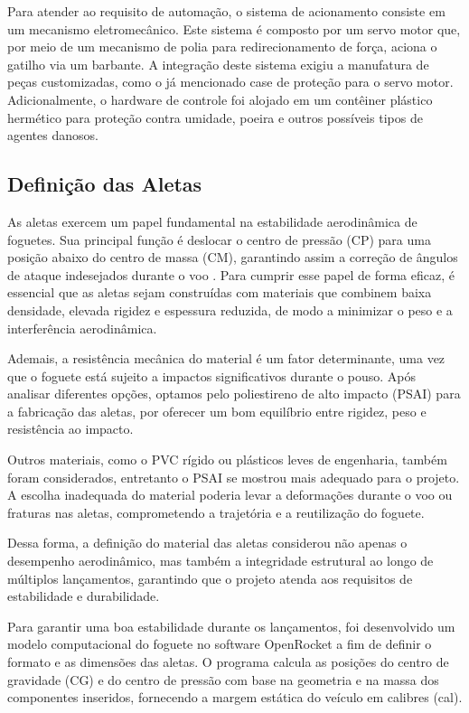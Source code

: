 Para atender ao requisito de automação, o sistema de acionamento consiste em um mecanismo eletromecânico. Este sistema é composto por um servo motor que, por meio de um mecanismo de polia para redirecionamento de força, aciona o gatilho via um barbante. A integração deste sistema exigiu a manufatura de peças customizadas, como o já mencionado case de proteção para o servo motor. Adicionalmente, o hardware de controle foi alojado em um contêiner plástico hermético para proteção contra umidade, poeira e outros possíveis tipos de agentes danosos. 

\subsection{Definição das Aletas}

As aletas exercem um papel fundamental na estabilidade aerodinâmica de foguetes. Sua principal função é deslocar o centro de pressão (CP) para uma posição abaixo do centro de massa (CM), garantindo assim a correção de ângulos de ataque indesejados durante o voo \cite{barrowman1966}. Para cumprir esse papel de forma eficaz, é essencial que as aletas sejam construídas com materiais que combinem baixa densidade, elevada rigidez e espessura reduzida, de modo a minimizar o peso e a interferência aerodinâmica. 

Ademais, a resistência mecânica do material é um fator determinante, uma vez que o foguete está sujeito a impactos significativos durante o pouso. Após analisar diferentes opções, optamos pelo poliestireno de alto impacto (PSAI) para a fabricação das aletas, por oferecer um bom equilíbrio entre rigidez, peso e resistência ao impacto. 

Outros materiais, como o PVC rígido ou plásticos leves de engenharia, também foram considerados, entretanto o PSAI se mostrou mais adequado para o projeto. A escolha inadequada do material poderia levar a deformações durante o voo ou fraturas nas aletas, comprometendo a trajetória e a reutilização do foguete. 

Dessa forma, a definição do material das aletas considerou não apenas o desempenho aerodinâmico, mas também a integridade estrutural ao longo de múltiplos lançamentos, garantindo que o projeto atenda aos requisitos de estabilidade e durabilidade. 

Para garantir uma boa estabilidade durante os lançamentos, foi desenvolvido um modelo computacional do foguete no software OpenRocket a fim de definir o formato e as dimensões das aletas. O programa calcula as posições do centro de gravidade (CG) e do centro de pressão com base na geometria e na massa dos componentes inseridos, fornecendo a margem estática do veículo em calibres (cal). 

